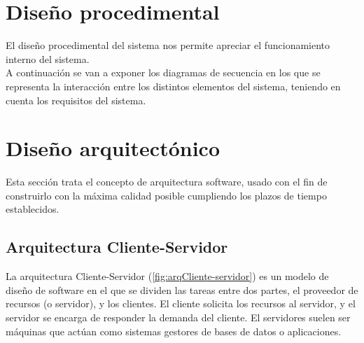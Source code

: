 \section{Diseño procedimental}

El diseño procedimental del sistema nos permite apreciar el funcionamiento interno del sistema.\\

A continuación se van a exponer los diagramas de secuencia en los que se representa la interacción entre los distintos elementos del sistema, teniendo en cuenta los requisitos del sistema.\\

\begin{landscape}
\end{landscape}



\section{Diseño arquitectónico}

Esta sección trata el concepto de arquitectura software, usado con el fin de construirlo con la máxima calidad posible cumpliendo los plazos de tiempo establecidos.

\subsection{Arquitectura Cliente-Servidor}

La arquitectura Cliente-Servidor (\ref{fig:arqCliente-servidor}) es un modelo de diseño de software en el que se dividen las  tareas entre dos partes, el proveedor de recursos (o servidor), y los clientes. El cliente solicita los recursos al servidor, y el servidor se encarga de responder la demanda del cliente. El servidores suelen ser máquinas que actúan como sistemas gestores de bases de datos o aplicaciones.
\label{fig:arqCliente-servidor}

